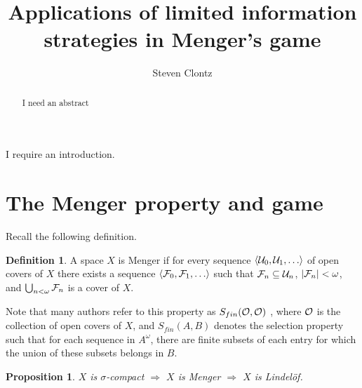 \documentclass{amsart}
\newtheorem{proposition}[theorem]{Proposition}
\theoremstyle{definition}
\newtheorem{definition}[theorem]{Definition}
\begin{document}
\title{Applications of limited information strategies in Menger's game}




\author{Steven Clontz}
\address{Department of Mathematics and Statistics, UNC Charlotte,
Charlotte, NC 28262}




\begin{abstract}
  I need an abstract
\end{abstract}


\maketitle

I require an introduction.

\section{The Menger property and game}

Recall the following definition.

\begin{definition}
  A space \(X\) is Menger if for every sequence \(\<\mc U_0,\mc U_1,\dots\>\)
  of open covers of \(X\) there exists a sequence
  \(\<\mc F_0,\mc F_1,\dots\>\) such that \(\mathcal{F}_n\subseteq \mathcal{U}_n\),
  \(|\mathcal{F}_n|<\omega\), and \(\bigcup_{n<\omega}\mathcal{F}_n\) is a cover of \(X\).
\end{definition}

Note that many authors refer to this property as \(S_{fin}(\mathcal{O},\mathcal{O})\)
\cite{MR1378387},
where \(\mathcal{O}\) is the collection of open covers of \(X\), and
\(S_{fin}(A,B)\) denotes the selection property such that for each
sequence in \(A^\omega\), there are finite subsets of each entry for which
the union of these subsets belongs in \(B\).

\begin{proposition}
  \(X\) is \(\sigma\)-compact
    \(\Rightarrow\)
  \(X\) is Menger
    \(\Rightarrow\)
  \(X\) is Lindel\"of.
\end{proposition}
\end{document}
